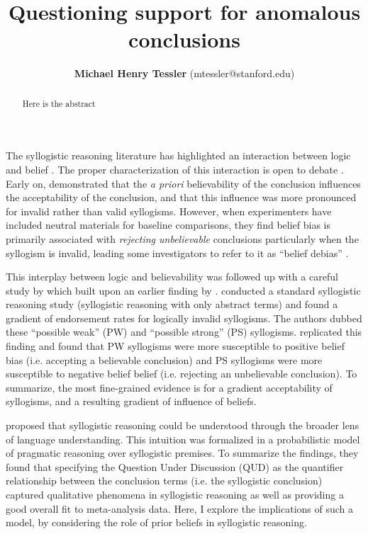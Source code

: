 \documentclass{llncs} %
\title{Questioning support for anomalous conclusions}
\author{{\large \bf Michael Henry Tessler} (mtessler@stanford.edu)}
\institute{Department of Psychology, Stanford University}
\begin{document}
\maketitle


\begin{abstract}
Here is the abstract
\end{abstract}

The syllogistic reasoning literature has highlighted an interaction between logic and belief \cite{Evans1983}. The proper characterization  of this interaction is open to debate \cite{Newstead1993, others}. Early on,  demonstrated that the \emph{a priori} believability of the conclusion influences the acceptability of the conclusion, and that this influence was more pronounced for invalid rather than valid syllogisms. However, when experimenters have included neutral materials for baseline comparisons, they find belief bias is primarily associated with \emph{rejecting unbelievable} conclusions particularly when the syllogism is invalid, leading some investigators to refer to it as ``belief debias'' \cite{Morley2004, Newstead1992}.

This interplay between logic and believability was followed up with a careful study by  which built upon an earlier finding by .  conducted a standard syllogistic reasoning study (syllogistic reasoning with only abstract terms) and found a gradient of endorsement rates for logically invalid syllogisms. The authors dubbed these ``possible weak'' (PW) and ``possible strong'' (PS) syllogisms.  replicated this finding and found that PW syllogisms were more susceptible to positive belief bias (i.e. accepting a believable conclusion) and PS syllogisms were more susceptible to negative belief belief (i.e. rejecting an unbelievable conclusion). To summarize, the most fine-grained evidence is for a gradient acceptability of syllogisms, and a resulting gradient of influence of beliefs. 

 proposed that syllogistic reasoning could be understood through the broader lens of language understanding. This intuition was formalized in a probabilistic model of pragmatic reasoning over syllogistic premises. To summarize the findings, they found that specifying the Question Under Discussion (QUD) as the quantifier relationship between the conclusion terms (i.e. the syllogistic conclusion) captured qualitative phenomena in syllogistic reasoning as well as providing a good overall fit to meta-analysis data. Here, I explore the implications of such a model, by considering the role of prior beliefs in syllogistic reasoning.
\end{document}
